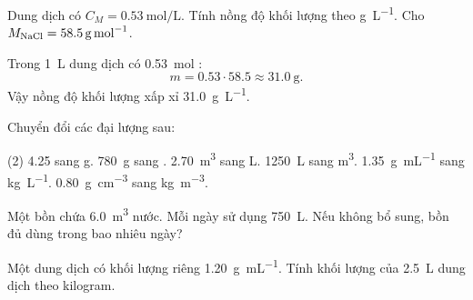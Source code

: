 \begin{vidu}
Dung dịch  có \(C_M=\SI{0.53}{\mole\per\liter}\). Tính nồng độ khối lượng theo \si{\gram\per\liter}. Cho \(M_{\ce{NaCl}}=\SI{58.5}{\gram\per\mole}\).
\end{vidu}
\begin{loigiai}
Trong \SI{1}{\liter} dung dịch có \SI{0.53}{\mole} :
\[
m=0.53\cdot58.5\approx\SI{31.0}{\gram}.
\]
Vậy nồng độ khối lượng xấp xỉ \SI{31.0}{\gram\per\liter}.
\end{loigiai}

\begin{tuluyen}
Chuyển đổi các đại lượng sau:
\begin{tasks}(2)
\task \SI{4.25}{\ton} sang \si{\gram}.
\task \SI{780}{\gram} sang \si{\ton}.
\task \SI{2.70}{\cubic\metre} sang \si{\liter}.
\task \SI{1250}{\liter} sang \si{\cubic\metre}.
\task \SI{1.35}{\gram\per\milli\liter} sang \si{\kilo\gram\per\liter}.
\task \SI{0.80}{\gram\per\cubic\centi\metre} sang \si{\kilo\gram\per\cubic\metre}.
\end{tasks}
\end{tuluyen}

\begin{tuluyen}
Một bồn chứa \SI{6.0}{\cubic\metre} nước. Mỗi ngày sử dụng \SI{750}{\liter}. Nếu không bổ sung, bồn đủ dùng trong bao nhiêu ngày?
\end{tuluyen}

\begin{tuluyen}
Một dung dịch có khối lượng riêng \SI{1.20}{\gram\per\milli\liter}. Tính khối lượng của \SI{2.5}{\liter} dung dịch theo kilogram.
\end{tuluyen}

